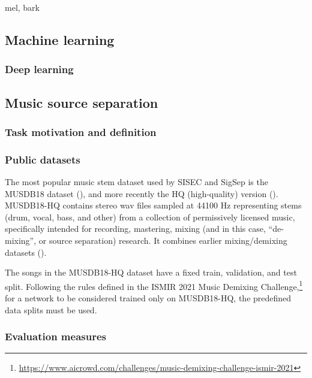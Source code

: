 \documentclass[report.tex]{subfiles}
\begin{document}
mel, bark

\newpagefill

\subsection{Machine learning}
\label{sec:ml}


\subsubsection{Deep learning}
\label{sec:dl}

\newpagefill

\subsection{Music source separation}
\label{sec:musicsep}

\subsubsection{Task motivation and definition}


\subsubsection{Public datasets}

The most popular music stem dataset used by SISEC and SigSep is the MUSDB18 dataset (\cite{musdb18}), and more recently the HQ (high-quality) version (\cite{musdb18hq}). MUSDB18-HQ contains stereo wav files sampled at 44100 Hz representing stems (drum, vocal, bass, and other) from a collection of permissively licensed music, specifically intended for recording, mastering, mixing (and in this case, ``de-mixing'', or source separation) research. It combines earlier mixing/demixing datasets (\cite{otherdataset1, otherdataset2}).

The songs in the MUSDB18-HQ dataset have a fixed train, validation, and test split. Following the rules defined in the ISMIR 2021 Music Demixing Challenge,\footnote{\url{https://www.aicrowd.com/challenges/music-demixing-challenge-ismir-2021}} for a network to be considered trained only on MUSDB18-HQ, the predefined data splits must be used.

\subsubsection{Evaluation measures}
\end{document}
